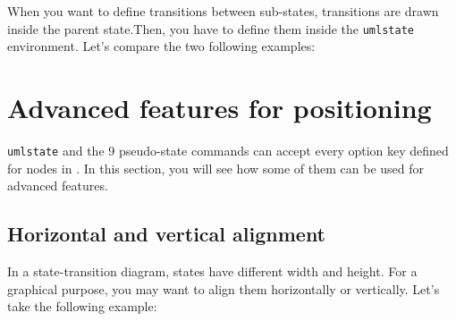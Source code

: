 \documentclass[a4paper,11pt]{report}
\begin{document}
When you want to define transitions between sub-states, transitions are drawn inside the parent state.Then, you have to define them inside the {\tt umlstate} environment. Let's compare the two following examples:

\medskip

\begin{minipage}{0.51\textwidth}
	
\end{minipage}
\begin{minipage}{0.49\textwidth}
	\begin{center}
	\end{center}
\end{minipage}

\begin{minipage}{0.51\textwidth}
	
\end{minipage}
\begin{minipage}{0.49\textwidth}
	\begin{center}
	\end{center}
\end{minipage}

\medskip\section{Advanced features for positioning}\label{s.stdiagadvfeat}

{\tt umlstate} and the 9 pseudo-state commands can accept every option key defined for nodes in \TikZ.
In this section, you will see how some of them can be used for advanced features.

\subsection{Horizontal and vertical alignment}\label{ss.stdiaghvalign}

In a state-transition diagram, states have different width and height. For a graphical purpose, you may want to align them horizontally or vertically. Let's take the following example:

\medskip

\begin{minipage}{0.5\textwidth}
	
\end{minipage}
\begin{minipage}{0.5\textwidth}
	\begin{center}
	\end{center}
\end{minipage}
\end{document}
